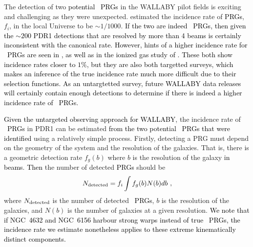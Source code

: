 \documentclass[fleqn,usenatbib]{mnras}
\newcommand{\hi}{\text{H\,\sc{i}}}
\begin{document}
The detection of two \textcolor{black}{potential \hi\ PRGs} in the WALLABY pilot fields is exciting and challenging as they were unexpected.  \citet{Reshetnikov2011} estimated the incidence rate of \textcolor{black}{PRGs}, $f_{i}$, in the local Universe to be $\sim 1/1000$. \textcolor{black}{If the two are indeed \hi\ PRGs, then given the $\sim200$ PDR1 detections that are resolved by more than 4 beams is certainly inconsistent with the canonical rate.} \textcolor{black}{However, hints of a higher incidence rate for \hi\ PRGs are seen in \citet{Serra2012}, as well as in the ionized gas study of \citet{Cao2022}.  These both show incidence rates closer to $1\%$, but they are also both targetted surveys, which makes an inference of the true incidence rate much more difficult due to their selection functions.  As an untargtetted survey, future WALLABY data releases will certainly contain enough detections to determine if there is indeed a higher incidence rate of \hi\ PRGs.}

\textcolor{black}{Given the untargeted observing approach for WALLABY}, the incidence rate of \textcolor{black}{\hi\ PRGs} in  PDR1 can be estimated \textcolor{black}{from the two \textcolor{black}{potential \hi\ PRGs} that were identified} using a relatively simple process.  Firstly, detecting a PRG must depend on the geometry of the system and the resolution of the galaxies.  That is, there is a geometric detection rate $f_{g}(b)$ where $b$ is the resolution of the galaxy \textcolor{black}{in beams}.  \textcolor{black}{Then} the number of detected \textcolor{black}{PRGs} should be
\begin{equation}\label{Eq:FullDetectionRate}
    N_{\rm{detected}}=f_{i} \int f_{g}(b) N(b) db~,
\end{equation}
where $N_{\rm{detected}}$ is the number of detected \textcolor{black}{\hi\ PRGs}, $b$ is the resolution of the galaxies, and $N(b)$ is the number of galaxies at a given resolution.  \textcolor{black}{We note that if NGC~4632 and NGC~6156 harbour strong warps instead of true \hi\ PRGs, the incidence rate we estimate nonetheless applies to these extreme kinematically distinct components.}
\end{document}
